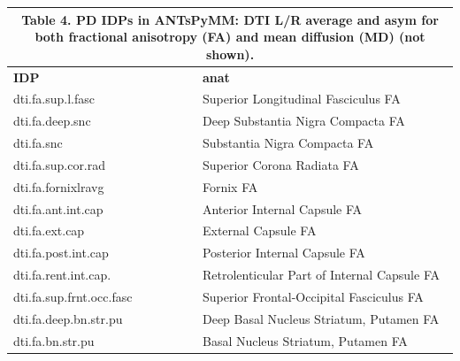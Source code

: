 \documentclass[
  table]{article}
\begin{document}
\begin{small}
\color{black}
\begin{tabular}{ll}
\multicolumn{2}{c}{\begin{minipage}[c]{0.8\linewidth}Table 4. PD IDPs in ANTsPyMM: DTI L/R average and asym for both fractional anisotropy (FA) and mean diffusion (MD) (not shown).\end{minipage}}\\ 
\hline
\textbf{IDP}&\textbf{anat}\\ 
\hline
\cellcolor{platinum}dti.fa.sup.l.fasc&\cellcolor{platinum}Superior Longitudinal Fasciculus FA\\ 
dti.fa.deep.snc&Deep Substantia Nigra Compacta FA\\ 
\cellcolor{platinum}dti.fa.snc&\cellcolor{platinum}Substantia Nigra Compacta FA\\ 
dti.fa.sup.cor.rad&Superior Corona Radiata FA\\ 
\cellcolor{platinum}dti.fa.fornixlravg&\cellcolor{platinum}Fornix FA\\ 
dti.fa.ant.int.cap&Anterior Internal Capsule FA\\ 
\cellcolor{platinum}dti.fa.ext.cap&\cellcolor{platinum}External Capsule FA\\ 
dti.fa.post.int.cap&Posterior Internal Capsule FA\\ 
\cellcolor{platinum}dti.fa.rent.int.cap.&\cellcolor{platinum}Retrolenticular Part of Internal Capsule FA\\ 
dti.fa.sup.frnt.occ.fasc&Superior Frontal-Occipital Fasciculus FA\\ 
\cellcolor{platinum}dti.fa.deep.bn.str.pu&\cellcolor{platinum}Deep Basal Nucleus Striatum, Putamen FA\\ 
dti.fa.bn.str.pu&Basal Nucleus Striatum, Putamen FA\\ 
\hline
\end{tabular}
\end{small}
\color{black}
\end{document}
